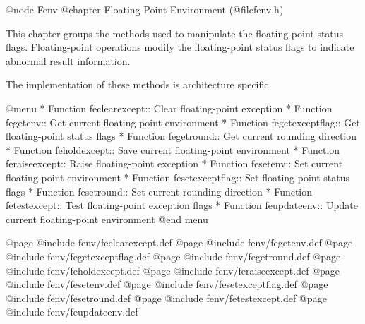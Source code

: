 @node Fenv
@chapter Floating-Point Environment (@file{fenv.h})

This chapter groups the methods used to manipulate the floating-point
status flags. Floating-point operations modify the floating-point
status flags to indicate abnormal result information.

The implementation of these methods is architecture specific.

@menu
* Function feclearexcept::		Clear floating-point exception
* Function fegetenv::		Get current floating-point environment
* Function fegetexceptflag::	Get floating-point status flags
* Function fegetround::		Get current rounding direction
* Function feholdexcept::		Save current floating-point environment
* Function feraiseexcept::		Raise floating-point exception
* Function fesetenv::		Set current floating-point environment
* Function fesetexceptflag::	Set floating-point status flags
* Function fesetround::		Set current rounding direction
* Function fetestexcept::		Test floating-point exception flags
* Function feupdateenv::		Update current floating-point environment
@end menu

@page
@include fenv/feclearexcept.def
@page
@include fenv/fegetenv.def
@page
@include fenv/fegetexceptflag.def
@page
@include fenv/fegetround.def
@page
@include fenv/feholdexcept.def
@page
@include fenv/feraiseexcept.def
@page
@include fenv/fesetenv.def
@page
@include fenv/fesetexceptflag.def
@page
@include fenv/fesetround.def
@page
@include fenv/fetestexcept.def
@page
@include fenv/feupdateenv.def
